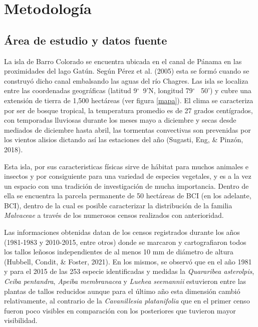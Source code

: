 \documentclass[11pt,]{article}
\begin{document}
\section{Metodología}\label{metodologuxeda}

\subsection{Área de estudio y datos
fuente}\label{uxe1rea-de-estudio-y-datos-fuente}

La isla de Barro Colorado se encuentra ubicada en el canal de Pánama en
las proximidades del lago Gatún. Según Pérez et al. (2005) esta se formó
cuando se construyó dicho canal embalsando las aguas del río Chagres.
Las isla se localiza entre las coordenadas geográficas (latitud
9\(^\circ\)~9'N, longitud 79\(^\circ\)~ 50') y cubre una extensión de
tierra de 1,500 hectáreas (ver figura \ref{mapa}). El clima se
caracteriza por ser de bosque tropical, la temperatura promedio es de 27
grados centígrados, con temporadas lluviosas durante los meses mayo a
diciembre y secas desde mediados de diciembre hasta abril, las tormentas
convectivas son prevenidas por los vientos alisios dictando así las
estaciones del año (Sugasti, Eng, \& Pinzón, 2018).

Esta isla, por sus caracteristicas físicas sirve de hábitat para muchos
animales e insectos y por consiguiente para una variedad de especies
vegetales, y es a la vez un espacio con una tradición de investigación
de mucha importancia. Dentro de ella se encuentra la parcela permanente
de 50 hectáreas de BCI (en los adelante, BCI), dentro de la cual es
posible caracterizar la distribución de la familia \emph{Malvaceae} a
través de los numerosos censos realizados con anterioridad.

Las informaciones obtenidas datan de los censos registrados durante los
años (1981-1983 y 2010-2015, entre otros) donde se marcaron y
cartografiaron todos los tallos leñosos independientes de al menos 10 mm
de diámetro de altura (Hubbell, Condit, \& Foster, 2021). En los mismos,
se observó que en el año 1981 y para el 2015 de las 253 especie
identificadas y medidas la \emph{Quararibea asterolpis}, \emph{Ceiba
pentandra}, \emph{Apeiba membranacea} y \emph{Luehea seemannii}
estuvieron entre las plantas de tallos reducidos aunque para el último
año esta dimensión cambió relativamente, al contrario de la
\emph{Cavanillesia platanifolia} que en el primer censo fueron poco
visibles en comparación con los posteriores que tuvieron mayor
visibilidad.
\end{document}
